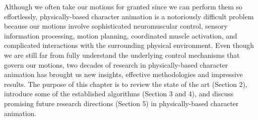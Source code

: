 Although we often take our motions for granted since we can perform them so effortlessly, physically-based character animation is a notoriously difficult problem because our motions involve sophisticated neuromuscular control, sensory information processing, motion planning, coordinated muscle activation, and complicated interactions with the surrounding physical environment. Even though we are still far from fully understand the underlying control mechanisms that govern our motions, two decades of research in physically-based character animation has brought us new insights, effective methodologies and impressive results. The purpose of this chapter is to review the state of the art (Section 2), introduce some of the established algorithms (Section 3 and 4), and discuss promising future research directions (Section 5) in physically-based character animation.

